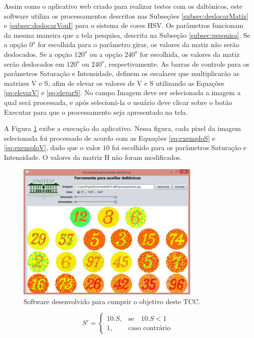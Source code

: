 \documentclass[	12pt, Times, openright, twoside, a4paper, english, brazil]{abntex2}
\begin{document}
Assim como o aplicativo web criado para realizar testes com os daltônicos, este software utiliza os processamentos descritos nas Subseções \ref{subsec:deslocarMatiz} e \ref{subsec:deslocarVouI} para o sistema de cores HSV. Os parâmetros funcionam da mesma maneira que a tela pesquisa, descrita na Subseção \ref{subsec:pesquisa}. Se a opção $0^o$ for escolhida para o parâmetro girar, os valores da matiz não serão deslocados. Se a opção $120^o$ ou a opção $240^o$ for escolhida, os valores da matiz serão deslocados em $120^o$ ou $240^o$, respectivamente. As barras de controle para os parâmetros Saturação e Intensidade, definem os escalares que multiplicarão as matrizes V e S, afim de elevar os valores de V e S utilizando as Equações \ref{eq:elevarV} e \ref{eq:elevarS}. No campo Imagem deve ser selecionada a imagem a qual será processada, e após selecioná-la o usuário deve clicar sobre o botão Executar para que o processamento seja apresentado na tela.

A Figura \ref{fig:telaFerramenta} exibe a execução do aplicativo. Nessa figura, cada pixel da imagem selecionada foi processado de acordo com as Equações \ref{eq:exemploS} e \ref{eq:exemploV}, dado que o valor $10$ foi escolhido para os parâmetros Saturação e Intensidade. O valores da matriz H não foram modificados.


\begin{figure}[!htb]
\centering \includegraphics[width=0.8\textwidth]{telaFerramenta.jpg}
\caption{Software desenvolvido para cumprir o objetivo deste TCC.} \label{fig:telaFerramenta}
\end{figure}

\begin{equation}
\label{eq:exemploS}
S'=\left\{
\begin{array}{rl}
       10 . S,&\mbox{se}\quad 10 . S < 1 \\
       1,&\mbox{caso contrário}
\end{array}\right.
\end{equation}
\end{document}
